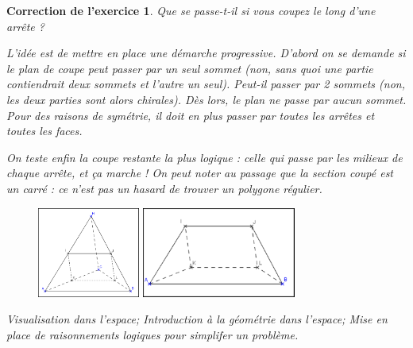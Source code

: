 \documentclass[12pt]{article}
\theoremstyle{break}
\newtheorem{cor}{Correction de l'exercice}
\begin{document}
\begin{cor}
\textit{Que se passe-t-il si vous coupez le long d'une arrête ?}

L'idée est de mettre en place une démarche progressive. D'abord on se demande si le plan de coupe peut passer par un seul sommet (non, sans quoi une partie contiendrait deux sommets et l'autre un seul). Peut-il passer par 2 sommets (non, les deux parties sont alors chirales). Dès lors, le plan ne passe par aucun sommet. Pour des raisons de symétrie, il doit en plus passer par toutes les arrêtes et toutes les faces.

On teste enfin la coupe restante la plus logique : celle qui passe par les milieux de chaque arrête, et ça marche ! On peut noter au passage que la section coupé est un carré : ce n'est pas un hasard de trouver un polygone régulier.

\begin{figure}[h!]
	\centering
    \includegraphics[width=0.3\textwidth]{CoupeTetraedreAvecSolution.png}
    \includegraphics[width=0.45\textwidth]{CoupeTetraedreAvecSolution2.png}
\end{figure}

\textit{Visualisation dans l'espace; Introduction à la géométrie dans l'espace; Mise en place de raisonnements logiques pour simplifer un problème.}

\end{cor}
\end{document}
